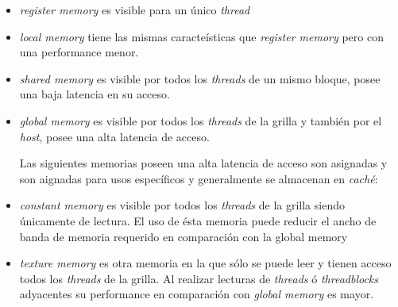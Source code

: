 \begin{itemize}
	\item  \textit{register memory} es visible para un único \textit{thread}
	\item \textit{local memory} tiene las mismas caracteísticas que \textit{register memory} pero con una performance menor.
	\item \textit{shared memory} es visible por todos los \textit{threads} de un mismo bloque, posee una baja latencia en su acceso.
	\item \textit{global memory} es visible por todos los \textit{threads} de la grilla y también por el \textit{host}, posee una alta latencia de acceso.
	
	Las siguientes memorias poseen una alta latencia de acceso son asignadas y son aignadas para usos específicos y generalmente se almacenan en \textit{caché}:
	
	\item \textit{constant memory} es visible por todos los \textit{threads} de la grilla siendo únicamente de lectura. El uso de ésta memoria puede reducir el ancho de banda de memoria requerido en comparación con la {global memory}
	\item \textit{texture memory} es otra memoria en la que sólo se puede leer y tienen acceso todos los \textit{threads} de la grilla. Al realizar lecturas de \textit{threads} ó \textit{threadblocks} adyacentes su performance en comparación con \textit{global memory} es mayor. 
	
\end{itemize}

